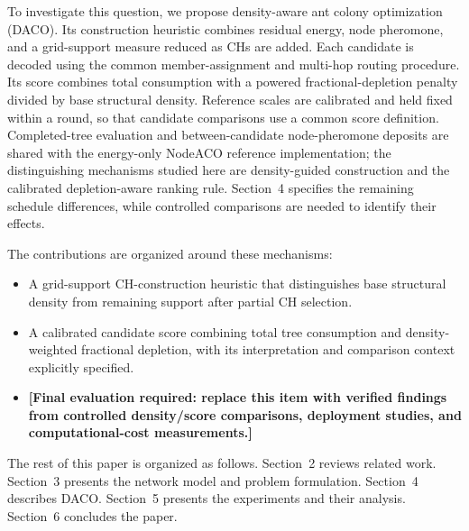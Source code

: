 To investigate this question, we propose density-aware ant colony
optimization (DACO). Its construction heuristic combines residual energy,
node pheromone, and a grid-support measure reduced as CHs are added.
Each candidate is decoded using the common member-assignment and
multi-hop routing procedure. Its score combines total consumption with
a powered fractional-depletion penalty divided by base structural
density. Reference scales are calibrated and held fixed within a round,
so that candidate comparisons use a common score definition. Completed-tree
evaluation and between-candidate node-pheromone deposits are shared with
the energy-only NodeACO reference implementation; the distinguishing
mechanisms studied here are density-guided construction and the calibrated
depletion-aware ranking rule. Section~4 specifies the remaining schedule
differences, while controlled comparisons are needed to identify their effects.

The contributions are organized around these mechanisms:
\begin{itemize}
\item A grid-support CH-construction heuristic that distinguishes base
structural density from remaining support after partial CH selection.
\item A calibrated candidate score combining total tree consumption and
density-weighted fractional depletion, with its interpretation and
comparison context explicitly specified.
\item \textbf{[Final evaluation required: replace this item with verified
findings from controlled density/score comparisons, deployment studies,
and computational-cost measurements.]}
\end{itemize}

The rest of this paper is organized as follows. Section~2 reviews related
work. Section~3 presents the network model and problem formulation.
Section~4 describes DACO. Section~5 presents the experiments and their
analysis. Section~6 concludes the paper.
